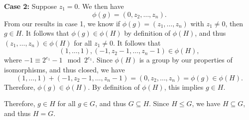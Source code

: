\documentclass[11pt, letterpaper]{report}
\begin{document}
\begin{solution}
\textbf{Case 2:} Suppose $z_1=0$. We then have
\[
	\phi (g)=\left( 0,z_2, \dots, z_n  \right)
.\]
From our results in case 1, we know if $\phi \left(g \right)=\left( z_1, \dots, z_n  \right)  $ with $z_1\neq 0$, then $g\in H$. It follows that $\phi (g)\in \phi (H)$ by definition of $\phi (H)$, and thus $\left( z_1, \dots, z_n  \right) \in \phi (H)$ for all $z_1\neq 0$. It follows that
\[
	(1,\ldots,1),(-1,z_2-1,\ldots,z_n-1)\in \phi (H)
,\]
where $-1\equiv 2^{e_1}-1\mod{2^{e_1}}$. Since $\phi (H)$ is a group by our properties of isomorphisms, and thus closed, we have 
\[(1,\ldots,1)+(-1,z_2-1,\ldots,z_n-1)=(0,z_2, \ldots,z_n)=\phi (g)\in \phi (H).\]
Therefore, $\phi (g)\in \phi \left( H \right) $. By definition of $\phi (H)$, this implies $g\in H$.

Therefore, $g\in H$ for all $g\in G$, and thus $G\subseteq H$. Since $H\leq G$, we have $H\subseteq G$, and thus $H=G$.
\end{solution}
\end{document}
